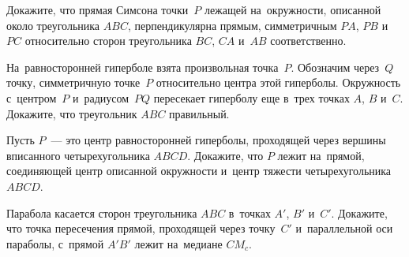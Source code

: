 \begin{problems}
\item
Докажите, что прямая Симсона точки~$P$ лежащей на~окружности, описанной около
треугольника $ABC$, перпендикулярна прямым, симметричным $PA$, $PB$ и~$PC$
относительно сторон треугольника $BC$, $CA$ и~$AB$ соответственно.

\item
На~равносторонней гиперболе взята произвольная точка~$P$.
Обозначим через~$Q$ точку, симметричную точке~$P$ относительно центра этой
гиперболы.
Окружность с~центром~$P$ и~радиусом~$PQ$ пересекает гиперболу еще в~трех точках
$A$, $B$ и~$C$.
Докажите, что треугольник $ABC$ правильный.

\item
Пусть $P$~--- это центр равносторонней гиперболы, проходящей через вершины
вписанного четырехугольника $ABCD$.
Докажите, что $P$ лежит на~прямой, соединяющей центр описанной окружности
и~центр тяжести четырехугольника $ABCD$.

\item
Парабола касается сторон треугольника $ABC$ в~точках $A'$, $B'$ и~$C'$.
Докажите, что точка пересечения прямой, проходящей через точку~$C'$
и~параллельной оси параболы, с~прямой $A'B'$ лежит на~медиане $C M_{c}$.

\end{problems}

